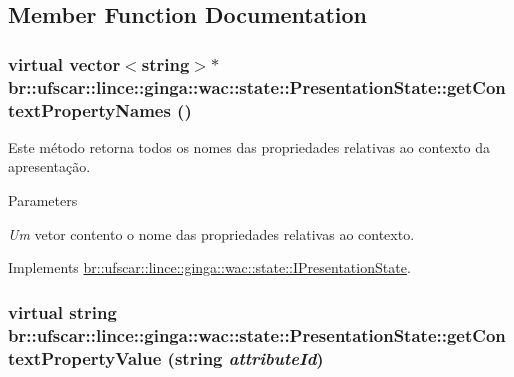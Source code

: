 \subsection{Member Function Documentation}
\hypertarget{classbr_1_1ufscar_1_1lince_1_1ginga_1_1wac_1_1state_1_1PresentationState_ab5f9e22342f390d01e54ca51f8a85609}{
\subsubsection[{getContextPropertyNames}]{\setlength{\rightskip}{0pt plus 5cm}virtual vector$<$string$>$$\ast$ br::ufscar::lince::ginga::wac::state::PresentationState::getContextPropertyNames ()}}
\label{classbr_1_1ufscar_1_1lince_1_1ginga_1_1wac_1_1state_1_1PresentationState_ab5f9e22342f390d01e54ca51f8a85609}


Este método retorna todos os nomes das propriedades relativas ao contexto da apresentação. 


\begin{DoxyParams}{Parameters}
\item[{\em Um}]vetor contento o nome das propriedades relativas ao contexto. \end{DoxyParams}


Implements \hyperlink{classbr_1_1ufscar_1_1lince_1_1ginga_1_1wac_1_1state_1_1IPresentationState_a3ec5c1d54f31461e1a3e81a54fefaa87}{br::ufscar::lince::ginga::wac::state::IPresentationState}.

\hypertarget{classbr_1_1ufscar_1_1lince_1_1ginga_1_1wac_1_1state_1_1PresentationState_a2931ba17e6dcd1352382fee289352f4b}{
\subsubsection[{getContextPropertyValue}]{\setlength{\rightskip}{0pt plus 5cm}virtual string br::ufscar::lince::ginga::wac::state::PresentationState::getContextPropertyValue (string {\em attributeId})}}
\label{classbr_1_1ufscar_1_1lince_1_1ginga_1_1wac_1_1state_1_1PresentationState_a2931ba17e6dcd1352382fee289352f4b}


